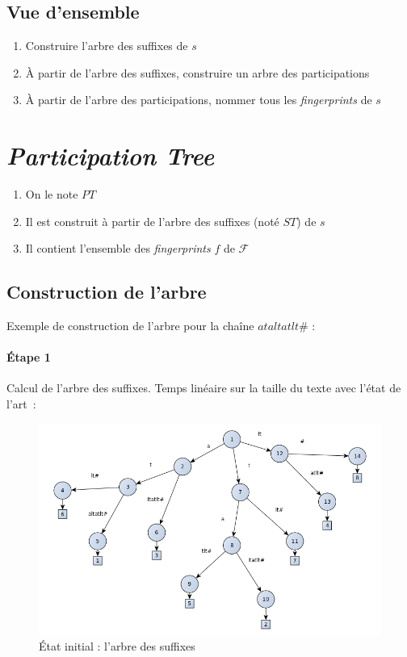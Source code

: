 \documentclass[a4paper]{article}
\begin{document}
\subsection{Vue d'ensemble}
	
\begin{enumerate}
	\item Construire l'arbre des suffixes de $s$
	\item À partir de l'arbre des suffixes, construire un arbre des participations
	\item À partir de l'arbre des participations, nommer tous les \textit{fingerprints} de $s$
\end{enumerate}

\section{\textit{Participation Tree}}

\begin{enumerate}
	\item On le note $PT$
	\item Il est construit à partir de l'arbre des suffixes (noté $ST$) de $s$
	\item Il contient l'ensemble des \emph{fingerprints} $f$ de $\mathcal{F}$
\end{enumerate}

\subsection{Construction de l'arbre}

Exemple de construction de l'arbre pour la chaîne $ataltatlt\#$ :

\paragraph{Étape 1} Calcul de l'arbre des suffixes. Temps linéaire
sur la taille du texte avec l'état de l'art~:

\begin{figure}[H]
\centering
\includegraphics[width=\textwidth]{./slides/img/construction-0.png}
\caption{État initial : l'arbre des suffixes}
\label{overflow}
\end{figure}
\end{document}
